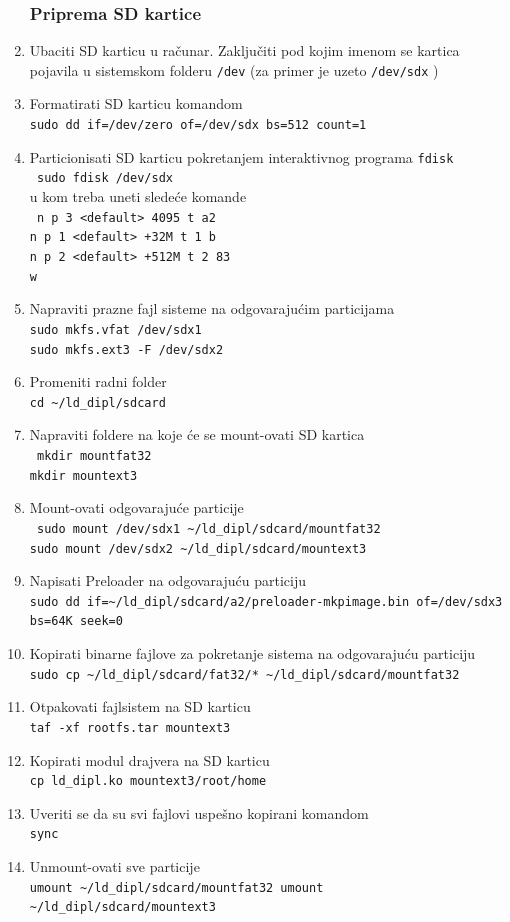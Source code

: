 \begin{enumerate}
\subsubsection{Priprema SD kartice}
\item Ubaciti SD karticu u računar. Zaključiti pod kojim imenom se kartica pojavila u sistemskom folderu \texttt{/dev} (za primer je uzeto \texttt{/dev/sdx} )
\item Formatirati SD karticu komandom\\
\texttt{sudo dd if=/dev/zero of=/dev/sdx bs=512 count=1}
\item Particionisati SD karticu pokretanjem interaktivnog programa \texttt{fdisk}\\
\texttt{ sudo fdisk /dev/sdx}\\
	u kom treba uneti sledeće komande\\
	\texttt{
	n p 3 <default> 4095 t a2 \\
 	n p 1 <default> +32M t 1 b \\
 	n p 2 <default> +512M t 2 83 \\
 	w \\
 	}
\item Napraviti prazne fajl sisteme na odgovarajućim particijama\\
\texttt{sudo mkfs.vfat /dev/sdx1\\
sudo mkfs.ext3 -F /dev/sdx2}
\item Promeniti radni folder\\
\texttt{cd \textasciitilde/ld\_dipl/sdcard}
\item Napraviti foldere na koje će se mount-ovati SD kartica\\
\texttt{
mkdir mountfat32\\
mkdir mountext3
}
\item Mount-ovati odgovarajuće particije\\
\texttt{
sudo mount /dev/sdx1 \textasciitilde/ld\_dipl/sdcard/mountfat32 \\
sudo mount /dev/sdx2 \textasciitilde/ld\_dipl/sdcard/mountext3
}
\item Napisati Preloader na odgovarajuću particiju\\
\texttt{sudo dd if=\textasciitilde/ld\_dipl/sdcard/a2/preloader-mkpimage.bin of=/dev/sdx3 bs=64K seek=0}
\item Kopirati binarne fajlove za pokretanje sistema na odgovarajuću particiju\\
\texttt{sudo cp \textasciitilde/ld\_dipl/sdcard/fat32/* \textasciitilde/ld\_dipl/sdcard/mountfat32} 
\item Otpakovati fajlsistem na SD karticu\\
\texttt{taf -xf rootfs.tar mountext3}
\item Kopirati modul drajvera na SD karticu\\
\texttt{cp ld\_dipl.ko mountext3/root/home}
\item Uveriti se da su svi fajlovi uspešno kopirani komandom\\
\texttt{sync}
\item Unmount-ovati sve particije\\
\texttt{umount \textasciitilde/ld\_dipl/sdcard/mountfat32
umount \textasciitilde/ld\_dipl/sdcard/mountext3}


\end{enumerate}
